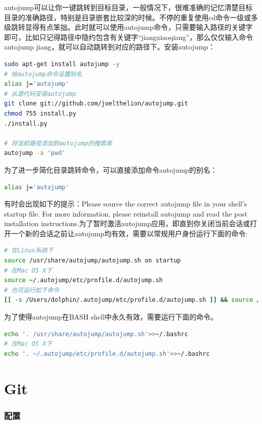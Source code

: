 \documentclass[letter]{book}
\begin{document}
autojump可以让你一键跳转到目标目录，一般情况下，很难准确的记忆清楚目标目录的准确路径，特别是目录嵌套比较深的时候。不停的重复使用cd命令一级或多级跳转显得有点笨拙。此时就可以使用autojump命令，只需要输入路径的关键字即可，比如只记得路径中隐约包含有关键字“jiangxiaoqiang”，那么仅仅输入命令autojump jiang，就可以自动跳转到对应的路径下。安装autojump：

\begin{lstlisting}[language=Bash]
sudo apt-get install autojump -y
# 给autojump命令设置别名
alias j='autojump'
# 从源代码安装autojump
git clone git://github.com/joelthelion/autojump.git
chmod 755 install.py
./install.py

# 将当前路径添加到autojump的搜索库
autojump -a 'pwd'
\end{lstlisting}

为了进一步简化目录跳转命令，可以直接添加命令autojump的别名：

\begin{lstlisting}[language=Bash]
alias j='autojump'
\end{lstlisting}

有时会出现如下的提示：Please source the correct autojump file in your shell's startup file. For more information, please reinstall autojump and read the post installation instructions.为了暂时激活autojump应用，即直到你关闭当前会话或打开一个新的会话之前让autojump均有效，需要以常规用户身份运行下面的命令:

\begin{lstlisting}[language=Bash]
# 在Linux系统下
source /usr/share/autojump/autojump.sh on startup
# 在Mac OS X下
source ~/.autojump/etc/profile.d/autojump.sh
# 也可运行如下命令
[[ -s /Users/dolphin/.autojump/etc/profile.d/autojump.sh ]] && source /Users/dolphin/.autojump/etc/profile.d/autojump.sh
\end{lstlisting}

为了使得autojump在BASH shell中永久有效，需要运行下面的命令。

\begin{lstlisting}[language=Bash]
echo '. /usr/share/autojump/autojump.sh'>>~/.bashrc
# 在Mac OS X下
echo '. ~/.autojump/etc/profile.d/autojump.sh'>>~/.bashrc
\end{lstlisting}

\chapter{Git}

\subsection{配置}
\end{document}
